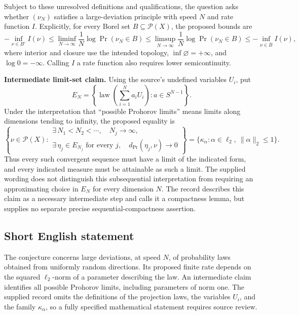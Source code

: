 \documentclass[11pt]{article}
\begin{document}
Subject to these unresolved definitions and qualifications, the question asks whether \((\nu_N)\) satisfies a large-deviation principle with speed \(N\) and rate function \(I\). Explicitly, for every Borel set \(B\subseteq\mathcal P(X)\), the proposed bounds are
\[
-\inf_{\nu\in B^\circ}I(\nu)
\leq\liminf_{N\to\infty}\frac1N\log\Pr(\nu_N\in B)
\leq\limsup_{N\to\infty}\frac1N\log\Pr(\nu_N\in B)
\leq-\inf_{\nu\in\overline B}I(\nu),
\]
where interior and closure use the intended topology, \(\inf\varnothing=+\infty\), and \(\log0=-\infty\). Calling \(I\) a rate function also requires lower semicontinuity.

\textbf{Intermediate limit-set claim.} Using the source's undefined variables \(U_i\), put
\[
E_N=\left\{\operatorname{law}\!\left(\sum_{i=1}^{N}a_iU_i\right):a\in S^{N-1}\right\}.
\]
Under the interpretation that ``possible Prohorov limits'' means limits along dimensions tending to infinity, the proposed equality is
\[
\left\{\nu\in\mathcal P(X):\begin{array}{l}
\exists\,N_1<N_2<\cdots,\quad N_j\to\infty,\\
\exists\,\eta_j\in E_{N_j}\text{ for every }j,\quad
 d_{\mathrm{Pr}}(\eta_j,\nu)\to0
\end{array}\right\}
=
\{\kappa_\alpha:\alpha\in\ell_2,\ \|\alpha\|_2\leq1\}.
\]
Thus every such convergent sequence must have a limit of the indicated form, and every indicated measure must be attainable as such a limit. The supplied wording does not distinguish this subsequential interpretation from requiring an approximating choice in \(E_N\) for every dimension \(N\). The record describes this claim as a necessary intermediate step and calls it a compactness lemma, but supplies no separate precise sequential-compactness assertion.
\subsection{Short English statement}
The conjecture concerns large deviations, at speed \(N\), of probability laws obtained from uniformly random directions. Its proposed finite rate depends on the squared \(\ell_2\)-norm of a parameter describing the law. An intermediate claim identifies all possible Prohorov limits, including parameters of norm one. The supplied record omits the definitions of the projection laws, the variables \(U_i\), and the family \(\kappa_\alpha\), so a fully specified mathematical statement requires source review.
\end{document}
